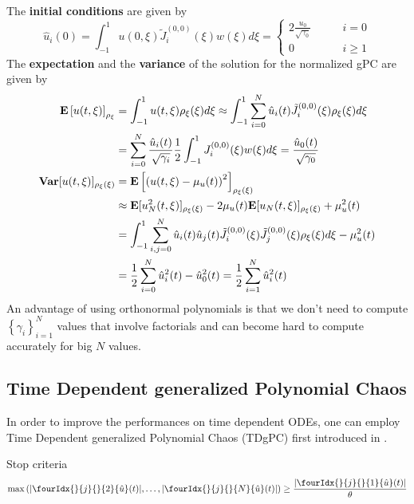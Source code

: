 \documentclass[a4paper,10pt]{article}
\begin{document}
\begin{exa}
\begin{equation}
\end{equation}
The \textbf{initial conditions} are given by
\begin{equation}
	\hat{u}_i(0) = \int_{-1}^1 u(0,\xi) \tilde{J}_i^{(0,0)}(\xi) w(\xi) d\xi = 
	\begin{cases}
	2 \frac{u_0}{\sqrt{\gamma_0}} \qquad & i=0\\
	0 \qquad & i \geq 1
	\end{cases}
\end{equation}
The \textbf{expectation} and the \textbf{variance} of the solution for the normalized gPC are given by
\begin{align}
	\mathbf{E}\left[ u(t,\xi) \right]_{\rho_\xi} &= \int_{-1}^1 u(t,\xi) \rho_\xi(\xi) d\xi \approx \int_{-1}^1 \sum_{i=0}^N \hat{u}_i(t) \tilde{J}_i^{(0,0)}(\xi) \rho_\xi(\xi) d\xi \\
	&= \sum_{i=0}^N \frac{\hat{u}_i(t)}{\sqrt{\gamma_i}} \frac{1}{2} \int_{-1}^1 J_i^{(0,0)}(\xi) w(\xi) d\xi = \frac{\hat{u}_0(t)}{\sqrt{\gamma_0}} \notag \\
	\mathbf{Var} [u(t,\xi)]_{\rho_\xi(\xi)} &= \mathbf{E} \left[ \left( u(t,\xi) - \mu_u(t) \right)^2 \right]_{\rho_\xi(\xi)} \\
	&\approx \mathbf{E} [ u_N^2(t,\xi) ]_{\rho_\xi(\xi)} - 2 \mu_u(t) \mathbf{E} [u_N(t,\xi)]_{\rho_\xi(\xi)} + \mu_u^2(t) \notag \\
	& = \int_{-1}^1 \sum_{i,j=0}^N \hat{u}_i(t) \hat{u}_j(t) \tilde{J}_i^{(0,0)}(\xi) \tilde{J}_j^{(0,0)}(\xi) \rho_\xi(\xi) d\xi - \mu_u^2(t) \notag \\
	& = \frac{1}{2} \sum_{i=0}^N \hat{u}_i^2(t) - \hat{u}_0^2(t) = \frac{1}{2} \sum_{i=1}^N \hat{u}_i^2(t) \notag
\end{align}
An advantage of using orthonormal polynomials is that we don't need to compute $ \left\lbrace \gamma_i \right\rbrace_{i=1}^N $ values that involve factorials and can become hard to compute accurately for big $N$ values.
\end{exa}

\subsection[Time Dependent gPC]{Time Dependent generalized Polynomial Chaos}
In order to improve the performances on time dependent ODEs, one can employ Time Dependent generalized Polynomial Chaos (TDgPC) first introduced in \cite{gerritsma_time-dependent_2010}.

Stop criteria
\begin{equation}\label{eq:TDgPC-StopCrit}
	\max\left( \vert \fourIdx{}{j}{}{2}{\hat{u}}(t) \vert, \dots, \vert \fourIdx{}{j}{}{N}{\hat{u}}(t) \vert \right) \geq \frac{\vert \fourIdx{}{j}{}{1}{\hat{u}}(t) \vert}{\theta}
\end{equation}
\end{document}
